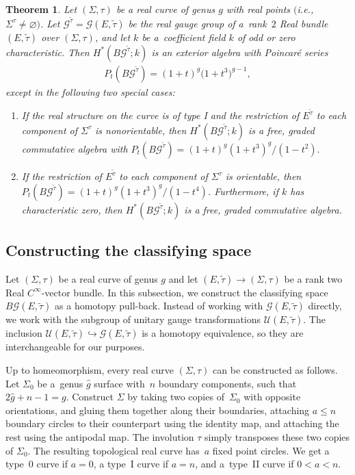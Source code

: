 \documentclass[pdftex]{sigma}
\numberwithin{equation}{section}
\newtheorem{Theorem}{Theorem}[section]
\begin{document}
\begin{Theorem}\label{bgring}
Let $(\Sigma, \tau)$ be a real curve of genus $g$ with real points $($i.e., $\Sigma^{\tau}\neq \varnothing)$. Let ${\mathcal G}^{\tilde{\tau}} = {\mathcal G}(E,\tilde{\tau})$ be the real gauge group of a~rank~$2$ Real bundle $(E,\tilde{\tau})$ over $(\Sigma, \tau)$, and let $k$ be a~coefficient field $k$ of odd or zero characteristic. Then $H^*(B{\mathcal G}^{{\tilde{\tau}}}; k)$ is an exterior algebra with Poincar\'e series \begin{gather*}P_t(B{\mathcal G}^{\tilde{\tau}}) =(1+t)^g\big(1+t^3\big)^{g-1},\end{gather*}
except in the following two special cases:
\begin{enumerate}\itemsep=0pt
	\item[$1.$] If the real structure on the curve is of type I and the restriction of $E^{{\tilde{\tau}}}$ to each component of $\Sigma^{\tau}$ is nonorientable, then $H^*(B{\mathcal G}^{\tilde{\tau}};k)$ is a free, graded commutative algebra with $P_t(B{\mathcal G}^{{\tilde{\tau}}}) = (1+t)^g(1+t^3)^{g}/(1-t^2).$
	
	\item[$2.$] If the restriction of $E^{{\tilde{\tau}}}$ to each component of $\Sigma^{\tau}$ is orientable, then $P_t(B{\mathcal G}^{{\tilde{\tau}}}) = (1+t)^g(1+t^3)^{g}/(1-t^4)$. Furthermore, if $k$ has characteristic zero, then $H^*(B{\mathcal G}^{\tilde{\tau}};k)$ is a free, graded commutative algebra.
\end{enumerate}
\end{Theorem}

\subsection{Constructing the classifying space}\label{constructtheclasspace}

Let $(\Sigma, \tau)$ be a real curve of genus $g$ and let $ (E,{\tilde{\tau}}) \rightarrow (\Sigma,\tau)$ be a rank two Real $C^{\infty}$-vector bundle. In this subsection, we construct the classifying space $B{\mathcal G}(E,\tilde{\tau})$ as a homotopy pull-back. Instead of working with ${\mathcal G}(E,\tilde{\tau})$ directly, we work with the subgroup of unitary gauge transformations $\mathcal{U}(E,\tilde{\tau})$. The inclusion $\mathcal{U}(E,\tilde{\tau}) \hookrightarrow {\mathcal G}(E,\tilde{\tau})$ is a homotopy equivalence, so they are interchangeable for our purposes.

Up to homeomorphism, every real curve $(\Sigma, \tau)$ can be constructed as follows. Let $\Sigma_0$ be a~genus $\hat{g}$ surface with~$n$ boundary components, such that $2\hat{g}+n-1 = g$. Construct $\Sigma$ by taking two copies of~$\Sigma_0$ with opposite orientations, and gluing them together along their boundaries, attaching $a \leq n$ boundary circles to their counterpart using the identity map, and attaching the rest using the antipodal map. The involution $\tau$ simply transposes these two copies of $\Sigma_0$. The resulting topological real curve has~$a$ f\/ixed point circles. We get a type~0 curve if $a=0$, a type~I curve if $a = n$, and a~type~II curve if $0< a< n$.
\end{document}
